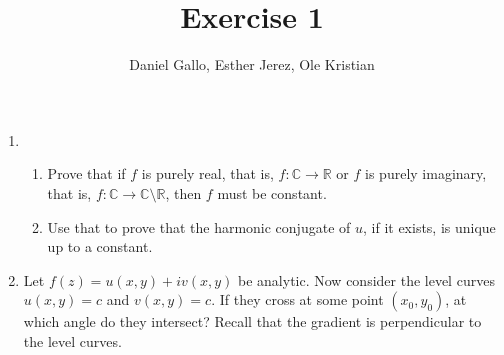 \documentclass{article}
\title{Exercise 1}
\author{Daniel Gallo, Esther Jerez, Ole Kristian}
\def\C{\mathbb{C}}
\def\R{\mathbb{R}}
\begin{document}
    \maketitle

    \begin{enumerate}
        \item 
            \begin{enumerate}
                \item Prove that if $f$ is purely real, that is, $f \colon \C \to \R$ or $f$ is purely imaginary, that is, $f \colon \C \to \C \setminus \R$, then $f$ must be constant.
                \item Use that to prove that the harmonic conjugate of $u$, if it exists, is unique up to a constant.
            \end{enumerate}
        \item Let $f(z) = u(x, y) + iv(x, y)$ be analytic. Now consider the level curves $u(x, y) = c$ and $v(x, y) = c$. If they cross at some point $(x_0, y_0)$, at which angle do they intersect? Recall that the gradient is perpendicular to the level curves.
    \end{enumerate}
\end{document}
